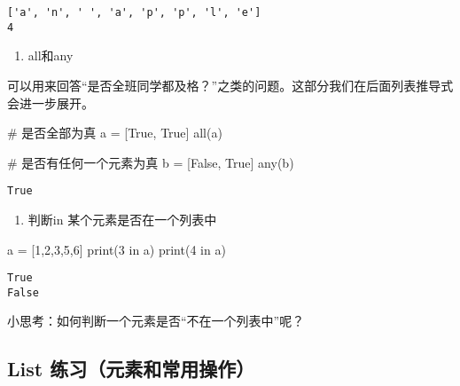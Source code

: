 \documentclass[
  letterpaper,
  DIV=11,
  numbers=noendperiod]{scrreprt}
\newenvironment{Shaded}{\begin{snugshade}}{\end{snugshade}}
\newcommand{\BuiltInTok}[1]{\textcolor[rgb]{0.00,0.23,0.31}{#1}}
\newcommand{\CommentTok}[1]{\textcolor[rgb]{0.37,0.37,0.37}{#1}}
\newcommand{\DecValTok}[1]{\textcolor[rgb]{0.68,0.00,0.00}{#1}}
\newcommand{\KeywordTok}[1]{\textcolor[rgb]{0.00,0.23,0.31}{#1}}
\newcommand{\NormalTok}[1]{\textcolor[rgb]{0.00,0.23,0.31}{#1}}
\newcommand{\OperatorTok}[1]{\textcolor[rgb]{0.37,0.37,0.37}{#1}}
\newcommand{\VariableTok}[1]{\textcolor[rgb]{0.07,0.07,0.07}{#1}}
\providecommand{\tightlist}{%
  \setlength{\itemsep}{0pt}\setlength{\parskip}{0pt}}\usepackage{longtable,booktabs,array}
\begin{document}
\begin{verbatim}
['a', 'n', ' ', 'a', 'p', 'p', 'l', 'e']
4
\end{verbatim}

\begin{enumerate}
\def\labelenumi{\arabic{enumi}.}
\setcounter{enumi}{6}
\tightlist
\item
  all和any
\end{enumerate}

可以用来回答``是否全班同学都及格？''之类的问题。这部分我们在后面列表推导式会进一步展开。

\begin{Shaded}
\begin{Highlighting}[]
\CommentTok{\# 是否全部为真}
\NormalTok{a }\OperatorTok{=}\NormalTok{ [}\VariableTok{True}\NormalTok{, }\VariableTok{True}\NormalTok{]}
\BuiltInTok{all}\NormalTok{(a) }

\CommentTok{\# 是否有任何一个元素为真}
\NormalTok{b }\OperatorTok{=}\NormalTok{ [}\VariableTok{False}\NormalTok{, }\VariableTok{True}\NormalTok{]}
\BuiltInTok{any}\NormalTok{(b)}
\end{Highlighting}
\end{Shaded}

\begin{verbatim}
True
\end{verbatim}

\begin{enumerate}
\def\labelenumi{\arabic{enumi}.}
\setcounter{enumi}{7}
\tightlist
\item
  判断in 某个元素是否在一个列表中
\end{enumerate}

\begin{Shaded}
\begin{Highlighting}[]
\NormalTok{a }\OperatorTok{=}\NormalTok{ [}\DecValTok{1}\NormalTok{,}\DecValTok{2}\NormalTok{,}\DecValTok{3}\NormalTok{,}\DecValTok{5}\NormalTok{,}\DecValTok{6}\NormalTok{]}
\BuiltInTok{print}\NormalTok{(}\DecValTok{3} \KeywordTok{in}\NormalTok{ a)}
\BuiltInTok{print}\NormalTok{(}\DecValTok{4} \KeywordTok{in}\NormalTok{ a)}
\end{Highlighting}
\end{Shaded}

\begin{verbatim}
True
False
\end{verbatim}

小思考：如何判断一个元素是否``不在一个列表中''呢？

\hypertarget{list-ux7ec3ux4e60ux5143ux7d20ux548cux5e38ux7528ux64cdux4f5c}{%
\subsection{List
练习（元素和常用操作）}\label{list-ux7ec3ux4e60ux5143ux7d20ux548cux5e38ux7528ux64cdux4f5c}}
\end{document}
